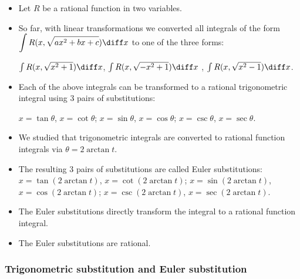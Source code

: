 \begin{frame}
\begin{itemize}
\item Let $R$ be a rational function in two variables.
\item<2-> So far, with linear transformations we converted all integrals of the form $\displaystyle\int R(x, \sqrt{ax^2+bx+c})\diff x$ to one of the three forms:

\alert<4,9>{$\int R(x, \sqrt{x^2+1})\diff x$}, \alert<5,10>{$\int R(x, \sqrt{-x^2+1})\diff x$} , \alert<6,11>{$\int R(x, \sqrt{x^2-1}) \diff x$}.
\item<3-> Each of the above integrals can be transformed to a rational trigonometric integral using 3 pairs of substitutions:

\alert<4,9>{$x=\tan\theta $, $x=\cot \theta$;}  
\alert<5,10>{$x=\sin\theta $, $x=\cos \theta$;}
\alert<6,11>{$x=\csc\theta $, $x=\sec \theta$.}
\item<7-> We studied that trigonometric integrals are converted to rational function integrals via $\theta=2\arctan t$.
\item<8-> The resulting 3 pairs of substitutions are called Euler substitutions:
\alert<9>{$x=\tan (2\arctan t) $, $x=\cot (2\arctan t)$;}  
\alert<10>{$x=\sin(2\arctan t) $, $x=\cos (2\arctan t)$;}
\alert<11>{$x=\csc(2\arctan t) $, $x=\sec (2\arctan t)$.}
\item<12-> The Euler substitutions directly transform the integral to a rational function integral.
\item<13-> The Euler substitutions are rational.
\end{itemize}

\end{frame}

\begin{frame}
\frametitle{Trigonometric substitution and Euler substitution}

\end{frame}
